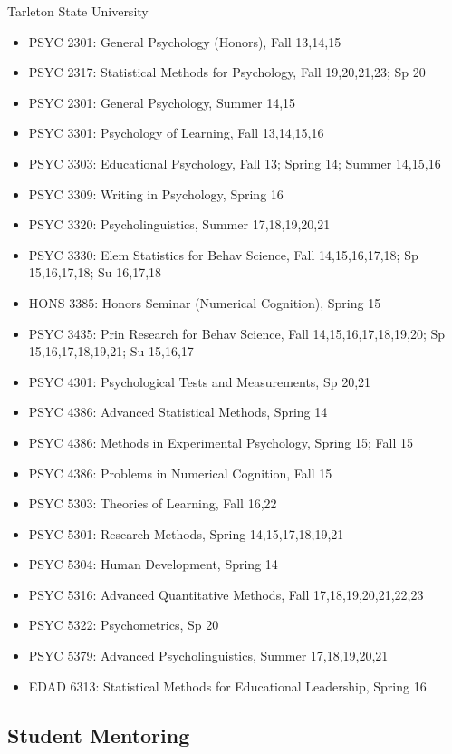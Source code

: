 \documentclass[article,10pt]{article}
\begin{document}
Tarleton State University

\begin{itemize}
\item PSYC 2301: General Psychology (Honors), Fall 13,14,15
\item PSYC 2317: Statistical Methods for Psychology, Fall 19,20,21,23; Sp 20
\item PSYC 2301: General Psychology, Summer 14,15
\item PSYC 3301: Psychology of Learning, Fall 13,14,15,16
\item PSYC 3303: Educational Psychology, Fall 13; Spring 14; Summer 14,15,16
\item PSYC 3309: Writing in Psychology, Spring 16
\item PSYC 3320: Psycholinguistics, Summer 17,18,19,20,21
\item PSYC 3330: Elem Statistics for Behav Science, Fall 14,15,16,17,18; Sp 15,16,17,18; Su 16,17,18
\item HONS 3385: Honors Seminar (Numerical Cognition), Spring 15
\item PSYC 3435: Prin Research for Behav Science, Fall 14,15,16,17,18,19,20; Sp 15,16,17,18,19,21; Su 15,16,17
\item PSYC 4301: Psychological Tests and Measurements, Sp 20,21
\item PSYC 4386: Advanced Statistical Methods, Spring 14
\item PSYC 4386: Methods in Experimental Psychology, Spring 15; Fall 15
\item PSYC 4386: Problems in Numerical Cognition, Fall 15
\item PSYC 5303: Theories of Learning, Fall 16,22
\item PSYC 5301: Research Methods, Spring 14,15,17,18,19,21
\item PSYC 5304: Human Development, Spring 14
\item PSYC 5316: Advanced Quantitative Methods, Fall 17,18,19,20,21,22,23
\item PSYC 5322: Psychometrics, Sp 20
\item PSYC 5379: Advanced Psycholinguistics, Summer 17,18,19,20,21
\item EDAD 6313: Statistical Methods for Educational Leadership, Spring 16
\end{itemize}

\subsection*{Student Mentoring}
\label{sec:org6c882c0}
\end{document}
